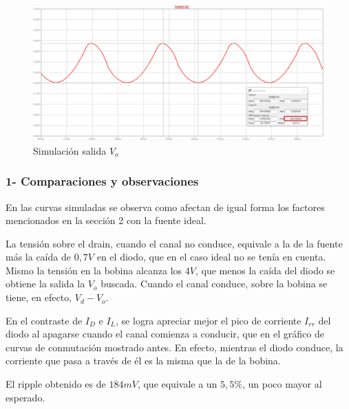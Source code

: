\documentclass[e4_tp1_main.tex]{subfiles}
\begin{document}
\begin{figure}[H]
\centering
\includegraphics[width=0.9\linewidth]{Imagenes/Punto3/Vo.png}
\caption{Simulación salida $V_o$}
\end{figure}

\subsubsection*{1- Comparaciones y observaciones}

En las curvas simuladas se observa como afectan de igual forma los factores mencionados en la sección 2 con la fuente ideal.\par
La tensión sobre el drain, cuando el canal no conduce, equivale a la de la fuente más la caída de $0,7V$ en el diodo, que en el caso ideal no se tenía en cuenta. Mismo la tensión en la bobina alcanza los $4V$, que menos la caída del diodo se obtiene la salida la $V_o$ buscada. Cuando el canal conduce, sobre la bobina se tiene, en efecto, $V_d-V_o$.
\par
En el contraste de $I_D$ e $I_L$, se logra apreciar mejor el pico de corriente $I_{rr}$ del diodo al apagarse cuando el canal comienza a conducir, que en el gráfico de curvas de conmutación mostrado antes. En efecto, mientras el diodo conduce, la corriente que pasa a través de él es la misma que la de la bobina.
\par
El ripple obtenido es de $184mV$, que equivale a un $5,5\%$, un poco mayor al esperado.

\newpage
\end{document}
